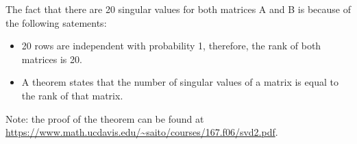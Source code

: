 \documentclass{article}
\begin{document}
The fact that there are 20 singular values for both matrices A and B is because of the following satements:

\begin{itemize}
    \item 20 rows are independent with probability 1, therefore, the rank of both matrices is 20.
    \item A theorem states that the number of singular values of a matrix is equal to the rank of that matrix.
\end{itemize}

Note: the proof of the theorem can be found at \\
\url{https://www.math.ucdavis.edu/~saito/courses/167.f06/svd2.pdf}.
\end{document}
